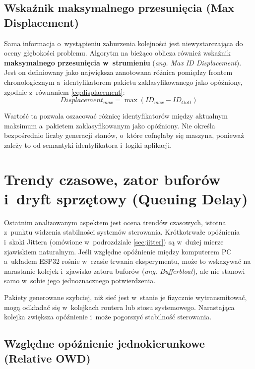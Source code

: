 \subsection{Wskaźnik maksymalnego przesunięcia (Max Displacement)}

Sama informacja o~wystąpieniu zaburzenia kolejności jest niewystarczająca do oceny głębokości problemu.
Algorytm na bieżąco oblicza również wskaźnik \textbf{maksymalnego przesunięcia w~strumieniu} (\textit{ang. Max ID Displacement}).
Jest on definiowany jako największa zanotowana różnica pomiędzy frontem chronologicznym a~identyfikatorem pakietu zaklasyfikowanego jako opóźniony, zgodnie z~równaniem \ref{eq:displacement}:
\begin{equation}
    Displacement_{max} = \max(ID_{max} - ID_{OoO}) \label{eq:displacement} \end{equation}

Wartość ta pozwala oszacować różnicę identyfikatorów między aktualnym maksimum a~pakietem zaklasyfikowanym jako opóźniony.
Nie określa bezpośrednio liczby generacji stanów, o~które cofnęłaby się maszyna, ponieważ zależy to od semantyki identyfikatora i~logiki aplikacji.

\section{Trendy czasowe, zator buforów i~dryft sprzętowy (Queuing Delay)}
\label{sec:timing_trends}

Ostatnim analizowanym aspektem jest ocena trendów czasowych, istotna z~punktu widzenia stabilności systemów sterowania.
Krótkotrwałe opóźnienia i~skoki Jittera (omówione w~podrozdziale \ref{sec:jitter}) są w~dużej mierze zjawiskiem naturalnym.
Jeśli względne opóźnienie między komputerem PC a~układem ESP32 rośnie w~czasie trwania eksperymentu, może to wskazywać na narastanie kolejek i~zjawisko zatoru buforów (\textit{ang. Bufferbloat}), ale nie stanowi samo w~sobie jego jednoznacznego potwierdzenia.

Pakiety generowane szybciej, niż sieć jest w~stanie je fizycznie wytransmitować, mogą odkładać się w~kolejkach routera lub stosu systemowego.
Narastająca kolejka zwiększa opóźnienie i~może pogorszyć stabilność sterowania.

\subsection{Względne opóźnienie jednokierunkowe (Relative OWD)}

